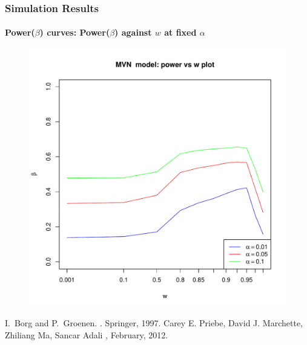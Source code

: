 \documentclass{beamer}
\begin{document}
\begin{frame}
  \frametitle{Simulation Results}
  \framesubtitle{Power($\beta$) curves: Power(${\beta}$) against $w$ at fixed $\alpha$}

  \begin{center}
	  \begin{figure}
	    \includegraphics[angle=0,scale=0.4]{OOSMVN-power-w-c001.pdf}
	  \end{figure}
	  
  \end{center}
\end{frame}


\begin{thebibliography}{BorgGroenen1997}
I.~Borg and P.~Groenen.
.
\newblock Springer, 1997.
Carey E. Priebe, David J. Marchette, Zhiliang Ma, Sancar Adali
,
\newblock February, 2012.


\end{thebibliography}
\end{document}
